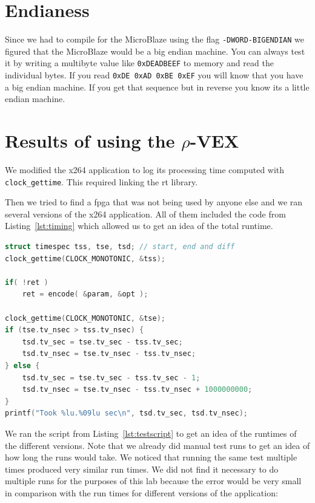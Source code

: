 \documentclass{article}
\newcommand{\rvex}{\ensuremath{\rho}-VEX}
\begin{document}
\section{Endianess}

Since we had to compile for the MicroBlaze using the flag
\texttt{-DWORD-BIGENDIAN} we figured that the MicroBlaze would be a big endian
machine.  You can always test it by writing a multibyte value like
\texttt{0xDEADBEEF} to memory and read the individual bytes. If you read
\texttt{0xDE 0xAD 0xBE 0xEF} you will know that you have a big endian machine.
If you get that sequence but in reverse you know its a little endian machine.

\section{Results of using the \rvex{}}

We modified the x264 application to log its processing time computed with
\texttt{clock\_gettime}. This required linking the rt library.

Then we tried to find a fpga that was not being used by anyone else and we ran
several versions of the x264 application.  All of them included the code from
Listing~\ref{lst:timing} which allowed us to get an idea of the total runtime.

\begin{lstlisting}[language=C,style=C,caption=Capturing runtime with the monotonic clock,label=lst:timing]
struct timespec tss, tse, tsd; // start, end and diff
clock_gettime(CLOCK_MONOTONIC, &tss);

if( !ret )
    ret = encode( &param, &opt );

clock_gettime(CLOCK_MONOTONIC, &tse);
if (tse.tv_nsec > tss.tv_nsec) {
    tsd.tv_sec = tse.tv_sec - tss.tv_sec;
    tsd.tv_nsec = tse.tv_nsec - tss.tv_nsec;
} else {
    tsd.tv_sec = tse.tv_sec - tss.tv_sec - 1;
    tsd.tv_nsec = tse.tv_nsec - tss.tv_nsec + 1000000000;
}
printf("Took %lu.%09lu sec\n", tsd.tv_sec, tsd.tv_nsec);
\end{lstlisting}

We ran the script from Listing~\ref{lst:testscript} to get an idea of the
runtimes of the different versions.  Note that we already did manual test runs
to get an idea of how long the runs would take.  We noticed that running the
same test multiple times produced very similar run times.  We did not find it
necessary to do multiple runs for the purposes of this lab because the error
would be very small in comparison with the run times for different versions of
the application:
\end{document}
